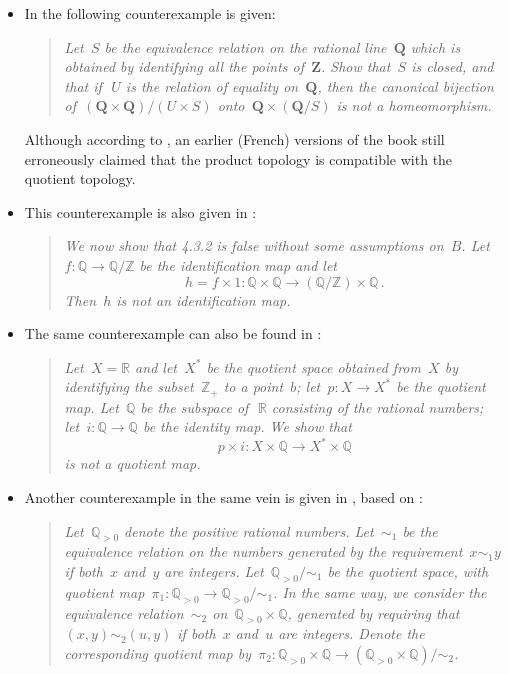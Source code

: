 \begin{itemize}

	\item
		In \autocite[Exercise~I.§5.6, p.~128]{bourbaki_general_topoly_1} the following counterexample is given:
		\begin{quote}
			\itshape
			Let~$S$ be the equivalence relation on the rational line~$\mathbf{Q}$ which is obtained by identifying all the points of~$\mathbf{Z}$.
			Show that~$S$ is closed, and that if~\,$U$\! is the relation of equality on~$\mathbf{Q}$, then the canonical bijection of~$(\mathbf{Q} × \mathbf{Q}) / (U × S)$ onto~$\mathbf{Q} × (\mathbf{Q} / S)$ is not a homeomorphism.
		\end{quote}
		Although according to \autocite{freedom_math_dance_quotient_product_bourbaki}, an earlier (French) versions of the book still erroneously claimed that the product topology is compatible with the quotient topology.

	\item
		This counterexample is also given in \cite[4.3, Example, p.~111]{brown_topology_and_groupoids}:
		\begin{quote}
			\itshape
			We now show that 4.3.2 is false without some assumptions on~$B$.
			Let~$f \colon ℚ \to ℚ / ℤ$ be the identification map and let
			\[
				h = f × 1 \colon ℚ × ℚ \to (ℚ / ℤ) × ℚ \,.
			\]
			Then~$h$ is not an identification map.
		\end{quote}

	\item
		The same counterexample can also be found in \autocite[Chapter~2, §22, Example~7, p.~141]{munkres_topology}:
		\begin{quote}
			\itshape
			Let~$X = ℝ$ and let~$X^*$ be the quotient space obtained from~$X$ by identifying the subset~$ℤ_+$ to a point~$b$;
			let~$p \colon X \to X^*$ be the quotient map.
			Let~$ℚ$ be the subspace of~\,$ℝ$ consisting of the rational numbers;
			let~$i \colon ℚ \to ℚ$ be the identity map.
			We show that
			\[
				p × i \colon X × ℚ \to X^* × ℚ
			\]
			is not a quotient map.
		\end{quote}

	\item
		Another counterexample in the same vein is given in \autocite{stackexchange_relation_product_quotient_topology}, based on \autocite[Exercise~4.4.7]{boekstedt_vosegaard_point_set_topology}:
		\begin{quote}
			\itshape
			Let~$ℚ_{> 0}$ denote the positive rational numbers.
			Let~$∼_1$ be the equivalence relation on the numbers generated by the requirement~$x ∼_1 y$ if both~$x$ and~$y$ are integers.
			Let~$ℚ_{> 0} / {∼_1}$ be the quotient space, with quotient map~$π_1 \colon ℚ_{> 0} \to ℚ_{> 0} / {∼_1}$.
			In the same way, we consider the equivalence relation~$∼_2$ on~$ℚ_{> 0} × ℚ$, generated by requiring that~$(x, y) ∼_2 (u, y)$ if both~$x$ and~$u$ are integers.
			Denote the corresponding quotient map by~$π_2 \colon ℚ_{> 0} × ℚ \to (ℚ_{> 0} × ℚ) / {∼_2}$.
			\begin{enumerate}[label=\arabic*.]


\end{enumerate}
\end{quote}
\end{itemize}
